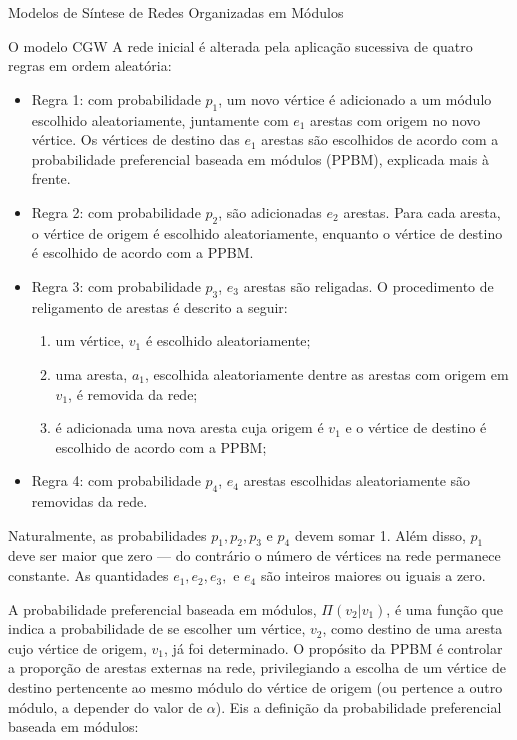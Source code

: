 \begin{section}{Modelos de Síntese de Redes Organizadas em Módulos}
\begin{subsection}{O modelo CGW}
A rede inicial é alterada pela aplicação sucessiva de quatro regras em ordem aleatória:

\begin{itemize}
	
	\item Regra 1: com probabilidade $p_1$, um novo vértice é adicionado a um módulo escolhido aleatoriamente, juntamente com $e_1$ arestas com origem no novo vértice. Os vértices de destino das $e_1$ arestas são escolhidos de acordo com a probabilidade preferencial baseada em módulos (PPBM), explicada mais à frente.
	
	\item Regra 2: com probabilidade $p_2$, são adicionadas $e_2$ arestas. Para cada aresta, o vértice de origem é escolhido aleatoriamente, enquanto o vértice de destino é escolhido de acordo com a PPBM.
	
	\item Regra 3: com probabilidade $p_3$, $e_3$ arestas são religadas. O procedimento de religamento de arestas é descrito a seguir:
	
	\begin{enumerate}
		\item um vértice, $v_1$ é escolhido aleatoriamente;
		\item uma aresta, $a_1$, escolhida aleatoriamente dentre as arestas com origem em $v_1$, é removida da rede;
		\item é adicionada uma nova aresta cuja origem é $v_1$ e o vértice de destino é escolhido de acordo com a PPBM;
	\end{enumerate}
	
	\item Regra 4: com probabilidade $p_4$, $e_4$ arestas escolhidas aleatoriamente são removidas da rede.
	
\end{itemize}

Naturalmente, as probabilidades $p_1, p_2, p_3$ e $p_4$ devem somar 1. Além disso, $p_1$ deve ser maior que zero --- do contrário o número de vértices na rede permanece constante. As quantidades $e_1, e_2, e_3, $ e $e_4$ são inteiros maiores ou iguais a zero.

A probabilidade preferencial baseada em módulos, $\Pi(v_2|v_1)$, é uma função que indica a probabilidade de se escolher um vértice, $v_2$, como destino de uma aresta cujo vértice de origem, $v_1$, já foi determinado. O propósito da PPBM é controlar a proporção de arestas externas na rede, privilegiando a escolha de um vértice de destino pertencente ao mesmo módulo do vértice de origem (ou pertence a outro módulo, a depender do valor de $\alpha$). Eis a definição da probabilidade preferencial baseada em módulos:


\end{subsection}
\end{section}
